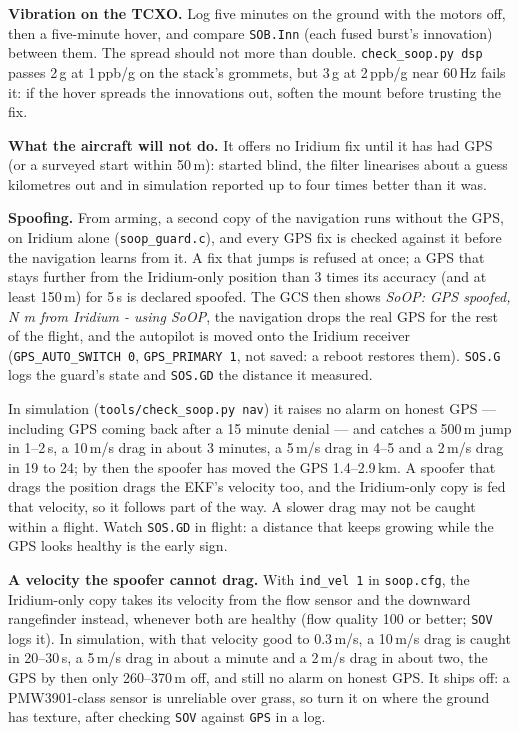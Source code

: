 \documentclass[11pt,a4paper]{article}
\newcommand{\file}[1]{\texttt{\small #1}}
\begin{document}
\textbf{Vibration on the TCXO.} Log five minutes on the ground with the motors off, then a
five-minute hover, and compare \file{SOB.Inn} (each fused burst's innovation) between them.
The spread should not more than double. \file{check\_soop.py dsp} passes 2\,g at 1\,ppb/g
on the stack's grommets, but 3\,g at 2\,ppb/g near 60\,Hz fails it: if the hover spreads
the innovations out, soften the mount before trusting the fix.

\textbf{What the aircraft will not do.} It offers no Iridium fix until it has had GPS (or a
surveyed start within 50\,m): started blind, the filter linearises about a guess kilometres
out and in simulation reported up to four times better than it was.

\textbf{Spoofing.} From arming, a second copy of the navigation runs without the GPS, on
Iridium alone (\file{soop\_guard.c}), and every GPS fix is checked against it before the
navigation learns from it. A fix that jumps is refused at once; a GPS that stays further
from the Iridium-only position than 3 times its accuracy (and at least 150\,m) for 5\,s is
declared spoofed. The GCS then shows \emph{SoOP: GPS spoofed, N m from Iridium - using
SoOP}, the navigation drops the real GPS for the rest of the flight, and the autopilot is
moved onto the Iridium receiver (\file{GPS\_AUTO\_SWITCH 0}, \file{GPS\_PRIMARY 1}, not
saved: a reboot restores them). \file{SOS.G} logs the guard's state and \file{SOS.GD} the
distance it measured.

In simulation (\file{tools/check\_soop.py nav}) it raises no alarm on honest GPS ---
including GPS coming back after a 15 minute denial --- and catches a 500\,m jump in 1--2\,s,
a 10\,m/s drag in about 3 minutes, a 5\,m/s drag in 4--5 and a 2\,m/s drag in 19 to 24;
by then the spoofer has moved the GPS 1.4--2.9\,km. A spoofer that drags the position drags
the EKF's velocity too, and the Iridium-only copy is fed that velocity, so it follows part of
the way. A slower drag may not be caught within a flight. Watch \file{SOS.GD} in flight: a
distance that keeps growing while the GPS looks healthy is the early sign.

\textbf{A velocity the spoofer cannot drag.} With \file{ind\_vel 1} in \file{soop.cfg}, the
Iridium-only copy takes its velocity from the flow sensor and the downward rangefinder instead,
whenever both are healthy (flow quality 100 or better; \file{SOV} logs it). In simulation, with
that velocity good to 0.3\,m/s, a 10\,m/s drag is caught in 20--30\,s, a 5\,m/s drag in
about a minute and a 2\,m/s drag in about two, the GPS by then only 260--370\,m off, and
still no alarm on honest GPS. It ships off: a PMW3901-class sensor is unreliable over grass,
so turn it on where the ground has texture, after checking \file{SOV} against \file{GPS}
in a log.
\end{document}
